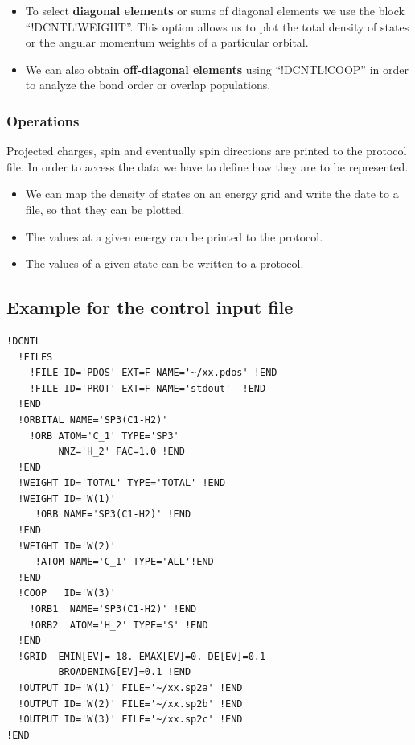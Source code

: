 \documentclass[final,12pt]{article}
\begin{document}
{\begin{itemize}

\item To select {\bf diagonal elements} or sums of diagonal elements we use
  the block ``!DCNTL!WEIGHT''. This option allows us to plot the
  total density of states or the angular momentum weights of a
  particular orbital.

\item We can also obtain {\bf off-diagonal elements} using
  ``!DCNTL!COOP'' in order to analyze the bond order or overlap
  populations.

\end{itemize}

\subsubsection{Operations}
Projected charges, spin and eventually spin directions are printed to
the protocol file.  In order to access the data we have to define how
they are to be represented.
\begin{itemize}
\item We can map the density of states on an energy grid and write the
date to a file, so that they can be plotted.
\item The values at a given energy can be printed to the protocol.
\item The values of a given state can be written to a protocol.
\end{itemize}




\subsection{Example for the control input file}

\begin{verbatim}
!DCNTL
  !FILES 
    !FILE ID='PDOS' EXT=F NAME='~/xx.pdos' !END
    !FILE ID='PROT' EXT=F NAME='stdout'  !END
  !END
  !ORBITAL NAME='SP3(C1-H2)'
    !ORB ATOM='C_1' TYPE='SP3' 
         NNZ='H_2' FAC=1.0 !END
  !END
  !WEIGHT ID='TOTAL' TYPE='TOTAL' !END
  !WEIGHT ID='W(1)'
     !ORB NAME='SP3(C1-H2)' !END
  !END
  !WEIGHT ID='W(2)'
     !ATOM NAME='C_1' TYPE='ALL'!END
  !END
  !COOP   ID='W(3)'
    !ORB1  NAME='SP3(C1-H2)' !END
    !ORB2  ATOM='H_2' TYPE='S' !END
  !END
  !GRID  EMIN[EV]=-18. EMAX[EV]=0. DE[EV]=0.1 
         BROADENING[EV]=0.1 !END
  !OUTPUT ID='W(1)' FILE='~/xx.sp2a' !END
  !OUTPUT ID='W(2)' FILE='~/xx.sp2b' !END
  !OUTPUT ID='W(3)' FILE='~/xx.sp2c' !END
!END
\end{verbatim}

}
\end{document}
